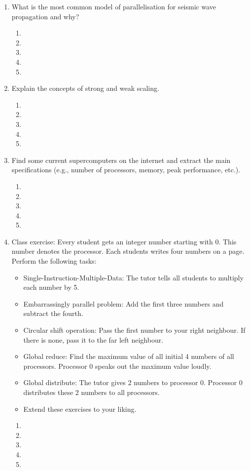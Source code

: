 \begin{enumerate}
\begin{enumerate}
\item[]
\item[] 
\end{enumerate}
\item
What is the most common model of parallelisation for seismic wave propagation and why? 
\begin{enumerate}
\item[]
\item[]
\item[] 
\item[]
\item[] 
\end{enumerate}
\item
Explain the concepts of strong and weak scaling. 
\begin{enumerate}
\item[]
\item[]
\item[] 
\item[]
\item[] 
\end{enumerate}
\item
Find some current supercomputers on the internet and extract the main specifications (e.g., number of processors, memory, peak performance, etc.). 
\begin{enumerate}
\item[]
\item[]
\item[] 
\item[]
\item[] 
\end{enumerate}
\item Class exercise: Every student gets an integer number starting with 0. This number denotes the processor. Each students writes four numbers on a page. Perform the following tasks:
\begin{itemize}
	\item Single-Instruction-Multiple-Data: The tutor tells all students to multiply each number by 5.
	\item Embarrassingly parallel problem: Add the first three numbers and subtract the fourth. 
	\item Circular shift operation: Pass the first number to your right neighbour. If there is none, pass it to the far left neighbour.  
	\item Global reduce: Find the maximum value of all initial 4 numbers of all processors. Processor 0 speaks out the maximum value loudly. 
	\item Global distribute: The tutor gives 2 numbers to processor 0. Processor 0 distributes these 2 numbers to all processors.    
	\item Extend these exercises to your liking. 
\end{itemize}
\begin{enumerate}
\item[]
\item[]
\item[] 
\item[]
\item[] 
\end{enumerate}
\end{enumerate}

